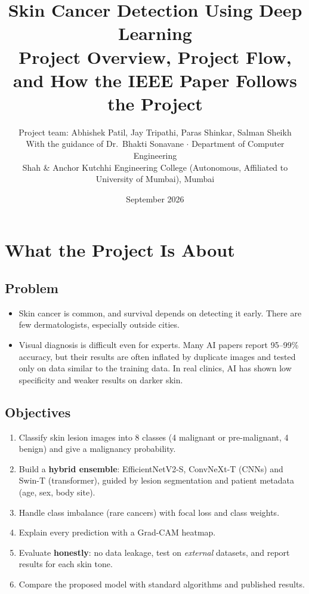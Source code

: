 \documentclass[10pt,a4paper]{article}
\title{\color{hcBlue}\bfseries Skin Cancer Detection Using Deep Learning\\[4pt]
\large Project Overview, Project Flow, and How the IEEE Paper Follows the Project}
\author{Project team: Abhishek Patil, Jay Tripathi, Paras Shinkar, Salman Sheikh\\
\small With the guidance of Dr.~Bhakti Sonavane \quad $\cdot$ \quad Department of Computer Engineering\\
\small Shah \& Anchor Kutchhi Engineering College (Autonomous, Affiliated to University of Mumbai), Mumbai}
\date{September 2026}
\begin{document}
\maketitle
\thispagestyle{empty}

\section{What the Project Is About}

\subsection{Problem}
\begin{itemize}
  \item Skin cancer is common, and survival depends on detecting it
        early. There are few dermatologists, especially outside cities.
  \item Visual diagnosis is difficult even for experts. Many
        AI papers report 95--99\% accuracy, but their results are often
        inflated by duplicate images and tested only on data similar to
        the training data. In real clinics, AI has shown low specificity
        and weaker results on darker skin.
\end{itemize}

\subsection{Objectives}
\begin{enumerate}
  \item Classify skin lesion images into 8 classes (4 malignant or
        pre-malignant, 4 benign) and give a malignancy probability.
  \item Build a \textbf{hybrid ensemble}: EfficientNetV2-S, ConvNeXt-T
        (CNNs) and Swin-T (transformer), guided by lesion segmentation
        and patient metadata (age, sex, body site).
  \item Handle class imbalance (rare cancers) with focal loss and
        class weights.
  \item Explain every prediction with a Grad-CAM heatmap.
  \item Evaluate \textbf{honestly}: no data leakage, test on
        \emph{external} datasets, and report results for each skin tone.
  \item Compare the proposed model with standard algorithms and
        published results.
\end{enumerate}
\end{document}
